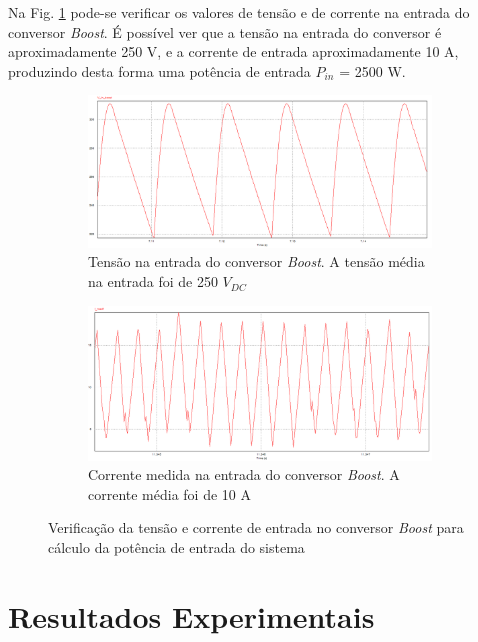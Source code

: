 Na Fig. \ref{fig:sim-tensao-corrente-boost} pode-se verificar os valores de tensão e de corrente na entrada do conversor \textit{Boost}.
É possível ver que a tensão na entrada do conversor é aproximadamente 250 V, e a corrente de entrada aproximadamente 10 A, produzindo desta forma uma potência de entrada $P_{in}$ = 2500 W.

\begin{figure}[!hbt]
	\centering
	\begin{subfigure}[b]{\textwidth}
		\centering
		\includegraphics[width=\textwidth]{figuras/sim_figures/sistema_completo/tensao_entrada_boost_2.PNG}
		\caption{Tensão na entrada do conversor \textit{Boost}. A tensão média na entrada foi de 250 $V_{DC}$}
	\end{subfigure}
	
	\begin{subfigure}[b]{\textwidth}
		\centering
		\includegraphics[width=\textwidth]{figuras/sim_figures/sistema_completo/corrente_entrada_boost_2.PNG}
		\caption{Corrente medida na entrada do conversor \textit{Boost}. A corrente média foi de 10 A}
	\end{subfigure}

	\caption{Verificação da tensão e corrente de entrada no conversor \textit{Boost} para cálculo da potência de entrada do sistema}
    \label{fig:sim-tensao-corrente-boost}
\end{figure}	


\section{Resultados Experimentais}